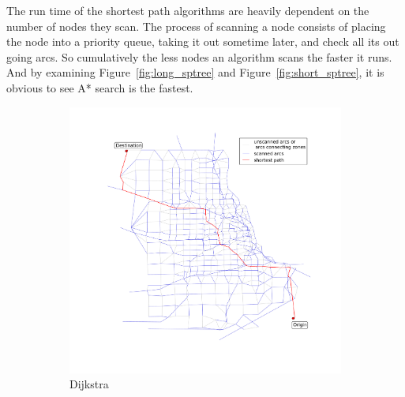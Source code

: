 The run time of the shortest path algorithms are heavily dependent on the number of nodes they scan.
The process of scanning a node consists of placing the node into a priority queue, taking it out sometime later, and check all its out going arcs.
So cumulatively the less nodes an algorithm scans the faster it runs.
And by examining Figure~\ref{fig:long_sptree} and Figure~\ref{fig:short_sptree},
it is obvious to see A* search is the fastest.

\begin{figure}
    \centering
    \begin{subfigure}{.5\textwidth}
        \centering
        \includegraphics[width=\textwidth,trim=120px 120px 48px 120px,clip]{img/chicago_dijkstra}
        \caption{Dijkstra}
        \label{fig:chicago_dijkstra}
    \end{subfigure}%
    \begin{subfigure}{.5\textwidth}
        \centering

\end{subfigure}
\end{figure}
